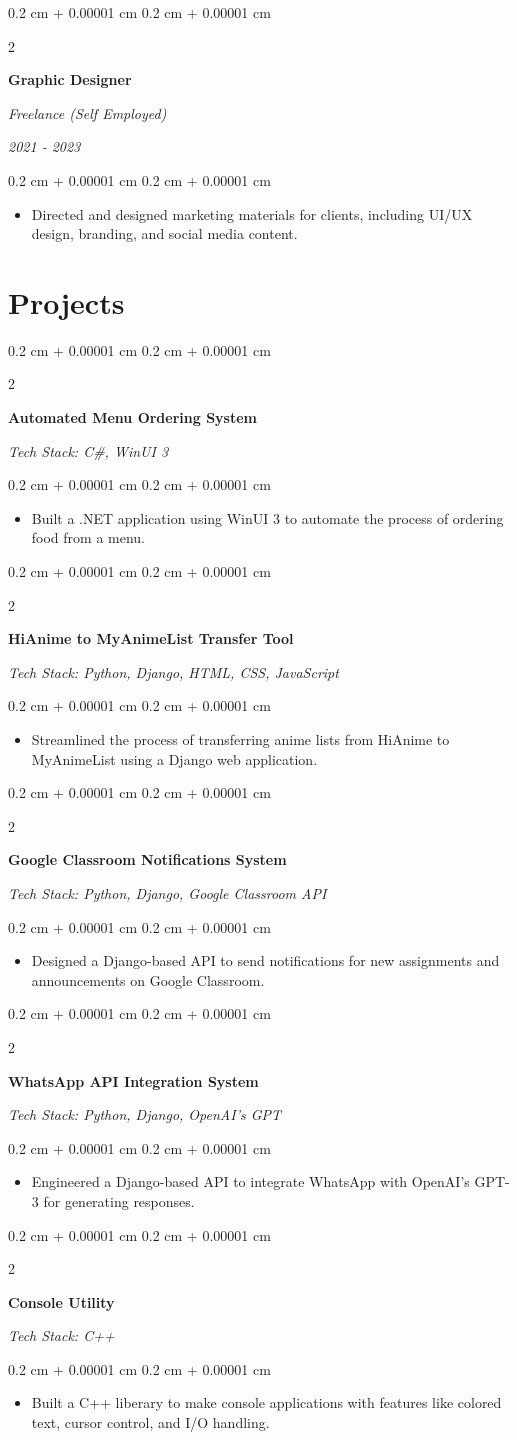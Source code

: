 \documentclass[10pt, a4paper]{article}
\newenvironment{highlights}{
    \begin{itemize}[
        topsep=0.1 cm,
        parsep=0.1 cm,
        partopsep=0pt,
        itemsep=0pt,
        leftmargin=0.4 cm + 10pt
    ]
}{
    \end{itemize}
} %
\newenvironment{onecolentry}{
    \begin{adjustwidth}{
        0.2 cm + 0.00001 cm
    }{
        0.2 cm + 0.00001 cm
    }
}{
    \end{adjustwidth}
} %
\newenvironment{twocolentry}[2][]{
    \onecolentry
    \def\secondColumn{#2}
    \begin{paracol}{2}
}{
    \switchcolumn \raggedleft \secondColumn
    \end{paracol}
    \endonecolentry
} %
\newcommand{\createpointblock}[5]{%
    \begin{twocolentry}{%
        \textit{#2}

        \textit{#4}}
        \textbf{#1}

        \textit{#3}
    \end{twocolentry}

    \vspace{0.1 cm}
    \begin{onecolentry}
        \begin{highlights}
            #5
        \end{highlights}
    \end{onecolentry}
}
\let\hrefWithoutArrow\href
\renewcommand{\href}[2]{\hrefWithoutArrow{#1}{\ifthenelse{\equal{#2}{}}{ }{#2 }\raisebox{.15ex}{\footnotesize \faExternalLink*}}}
\begin{document}
    \vspace{0.2 cm}

    \createpointblock{Graphic Designer}{2021 - 2023}{Freelance (Self Employed)}{}
    {%
        \item Directed and designed marketing materials for clients, including UI/UX design, branding, and social media content.
    }

\section{Projects}

\createpointblock{Automated Menu Ordering System\href{https://github.com/abdbbdii/Automated-Menu-Ordering-System}{}}{}
{Tech Stack: C\#, WinUI 3}{}
{%
	\item Built a .NET application using WinUI 3 to automate the process of ordering food from a menu.
}

\vspace{0.2 cm}

\createpointblock{HiAnime to MyAnimeList Transfer Tool\href{https://github.com/abdbbdii/hianime-to-myanimelist}{}}{}
{Tech Stack: Python, Django, HTML, CSS, JavaScript}{}
{%
	\item Streamlined the process of transferring anime lists from HiAnime to MyAnimeList using a Django web application.
}

\vspace{0.2 cm}

\createpointblock{Google Classroom Notifications System\href{https://github.com/abdbbdii/Google_Classroom_API}{}}{}
{Tech Stack: Python, Django, Google Classroom API}{}
{%
	\item Designed a Django-based API to send notifications for new assignments and announcements on Google Classroom.
}

\vspace{0.2 cm}

\createpointblock{WhatsApp API Integration System\href{https://github.com/abdbbdii/Whatsapp_API}{}}{}
{Tech Stack: Python, Django, OpenAI's GPT}{}
{%
	\item Engineered a Django-based API to integrate WhatsApp with OpenAI's GPT-3 for generating responses.
}

\vspace{0.2 cm}

\createpointblock{Console Utility\href{https://github.com/abdbbdii/ConsoleUtility}{}}{}
{Tech Stack: C++}{}
{%
	\item Built a C++ liberary to make console applications with features like colored text, cursor control, and I/O handling.
}
\end{document}
